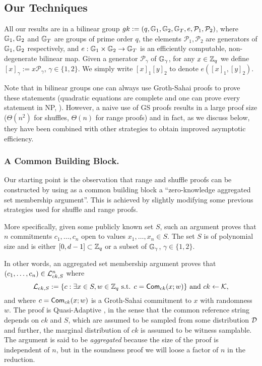 \subsection{Our Techniques}
All our results are in a bilinear group $gk:=(q,\mathbb{G}_1,\mathbb{G}_2,\mathbb{G}_T,e,\mathcal{P}_1,\mathcal{P}_2)$, where $\mathbb{G}_1,\mathbb{G}_2$
and $\mathbb{G}_T$ are groups of prime order $q$, the elements $\mathcal{P}_1, \mathcal{P}_2$ are generators of 
$\mathbb{G}_1,\mathbb{G}_2$ respectively, and $e:\mathbb{G}_1\times\mathbb{G}_2\to\mathbb{G}_T$ is an efficiently
computable, non-degenerate bilinear map. Given a generator $\mathcal{P}_\gamma$ of $\mathbb{G}_\gamma$, for any $x\in\mathbb{Z}_q$ we define $[x]_\gamma:=x\mathcal{P}_\gamma$, $\gamma\in\{1,2\}$. We simply write $[x]_1[y]_2$ to denote $e([x]_1,[y]_2)$.

Note that in bilinear groups one can always use Groth-Sahai proofs to prove these statements (quadratic equations are complete and one can prove every statement in NP, \cite{EC:GroOstSah06}).  However, a  naive use of GS proofs results in a large proof size ($\Theta(n^2)$ for shuffles, $\Theta(n)$ for range proofs) and in fact, as we discuss below, they have been combined with other strategies to obtain improved asymptotic efficiency. 

\subsubsection{A Common Building Block.} Our starting point is the observation that range and shuffle proofs can be constructed by using as a common building block a 
``zero-knowledge aggregated set membership argument''. This is achieved by slightly modifying some previous strategies used for shuffle and range proofs.

More specifically,  given some publicly known set $S$, such an argument proves that $n$ commitments $c_1,\ldots,c_n$ open to values $x_1,\ldots,x_n \in S$.  The set $S$ is of polynomial size and is either $[0,d-1]\subset\mathbb{Z}_q$ or a subset of $\mathbb{G}_\gamma$, $\gamma \in \{1,2\}$. 
 
In other words, an aggregated set membership argument proves that $(c_1,\ldots,c_n) \in \mathcal{L}_{ck,S}^n$ where 
$$
\mathcal{L}_{ck,S}:=\{c: \exists x\in S, w\in\mathbb{Z}_q \text{ s.t. } c=\mathsf{Com}_{ck}(x;w)\}\text{ and }ck\gets\mathcal{K},
$$
and where $c=\mathsf{Com}_{ck}(x;w)$ is a Groth-Sahai commitment to $x$ with randomness $w$. The proof is Quasi-Adaptive \cite{AC:JutRoy13}, in the sense that the common reference string depends on $ck$ and $S$, which are assumed to be sampled from some distribution $\mathcal{D}$
and further, the marginal distribution of $ck$ is assumed to be witness samplable. The argument is said to be \textit{aggregated} because the size of the proof is independent of $n$, but in the soundness proof we will loose a factor of $n$ in the reduction. 

